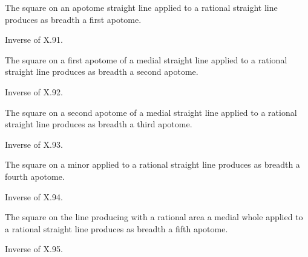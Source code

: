 \documentclass{rrxiv}
\begin{document}
\begin{claim}
\label{prop:X.97}
The square on an apotome straight line applied to a rational
straight line produces as breadth a first apotome.
\end{claim}
\begin{evidence}[Proof of X.97]
\label{ev:X.97}
Inverse of X.91.
\end{evidence}

\begin{claim}
\label{prop:X.98}
The square on a first apotome of a medial straight line applied to
a rational straight line produces as breadth a second apotome.
\end{claim}
\begin{evidence}[Proof of X.98]
\label{ev:X.98}
Inverse of X.92.
\end{evidence}

\begin{claim}
\label{prop:X.99}
The square on a second apotome of a medial straight line applied to
a rational straight line produces as breadth a third apotome.
\end{claim}
\begin{evidence}[Proof of X.99]
\label{ev:X.99}
Inverse of X.93.
\end{evidence}

\begin{claim}
\label{prop:X.100}
The square on a minor applied to a rational straight line produces
as breadth a fourth apotome.
\end{claim}
\begin{evidence}[Proof of X.100]
\label{ev:X.100}
Inverse of X.94.
\end{evidence}

\begin{claim}
\label{prop:X.101}
The square on the line producing with a rational area a medial whole
applied to a rational straight line produces as breadth a fifth
apotome.
\end{claim}
\begin{evidence}[Proof of X.101]
\label{ev:X.101}
Inverse of X.95.
\end{evidence}
\end{document}
